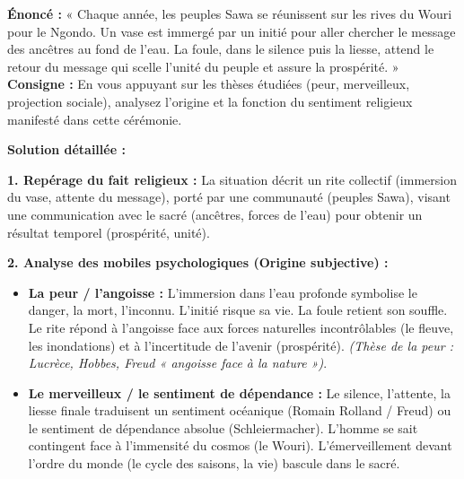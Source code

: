 \documentclass[11pt]{article}
\newcommand{\cle}[1]{{\popxbold\color{popdark}#1}}
\begin{document}
\begin{exoresolu}
\textbf{Énoncé :} « Chaque année, les peuples Sawa se réunissent sur les rives du Wouri pour le Ngondo. Un vase est immergé par un initié pour aller chercher le message des ancêtres au fond de l'eau. La foule, dans le silence puis la liesse, attend le retour du message qui scelle l'unité du peuple et assure la prospérité. »
\textbf{Consigne :} En vous appuyant sur les thèses étudiées (peur, merveilleux, projection sociale), analysez l'origine et la fonction du sentiment religieux manifesté dans cette cérémonie.

\tcblower
\textbf{Solution détaillée :}

\textbf{1. Repérage du fait religieux :} La situation décrit un \cle{rite} collectif (immersion du vase, attente du message), porté par une \cle{communauté} (peuples Sawa), visant une \cle{communication avec le sacré} (ancêtres, forces de l'eau) pour obtenir un résultat temporel (prospérité, unité).

\textbf{2. Analyse des mobiles psychologiques (Origine subjective) :}
\begin{itemize}
    \item \textbf{La peur / l'angoisse :} L'immersion dans l'eau profonde symbolise le danger, la mort, l'inconnu. L'initié risque sa vie. La foule retient son souffle. Le rite répond à l'angoisse face aux forces naturelles incontrôlables (le fleuve, les inondations) et à l'incertitude de l'avenir (prospérité). \emph{(Thèse de la peur : Lucrèce, Hobbes, Freud « angoisse face à la nature »)}.
    \item \textbf{Le merveilleux / le sentiment de dépendance :} Le silence, l'attente, la liesse finale traduisent un \cle{sentiment océanique} (Romain Rolland / Freud) ou le \cle{sentiment de dépendance absolue} (Schleiermacher). L'homme se sait contingent face à l'immensité du cosmos (le Wouri). L'émerveillement devant l'ordre du monde (le cycle des saisons, la vie) bascule dans le sacré.
\end{itemize}


\end{exoresolu}
\end{document}
